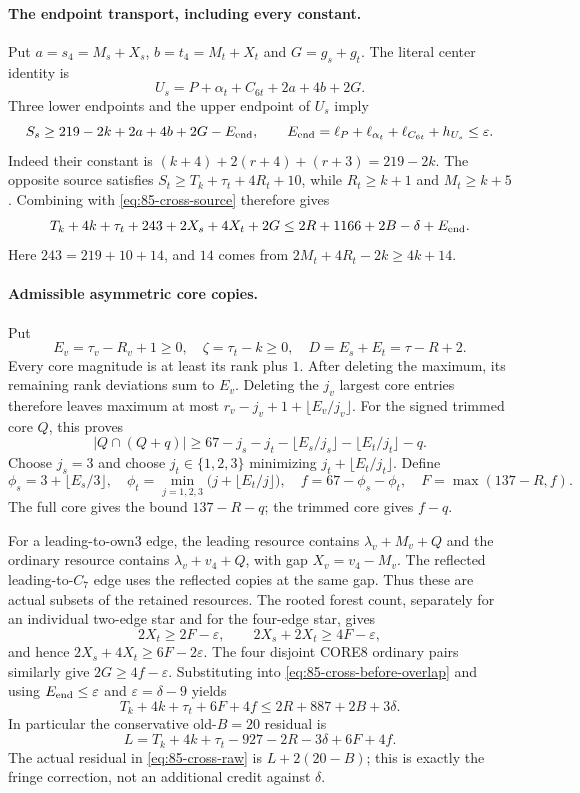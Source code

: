 \paragraph{The endpoint transport, including every constant.}
Put $a=s_4=M_s+X_s$, $b=t_4=M_t+X_t$ and $G=g_s+g_t$.
The literal center identity is
\[
 U_s=P+\alpha_t+C_{6t}+2a+4b+2G.
\]
Three lower endpoints and the upper endpoint of $U_s$ imply
\[
 S_s\ge219-2k+2a+4b+2G-E_{\rm end},\qquad
 E_{\rm end}=\ell_P+\ell_{\alpha_t}+\ell_{C_{6t}}+h_{U_s}
 \le\varepsilon.
\]
Indeed their constant is
$(k+4)+2(r+4)+(r+3)=219-2k$.
The opposite source satisfies
$S_t\ge T_k+\tau_t+4R_t+10$, while
$R_t\ge k+1$ and $M_t\ge k+5$.
Combining with \eqref{eq:85-cross-source} therefore gives
\begin{equation}\label{eq:85-cross-before-overlap}
 T_k+4k+\tau_t+243+2X_s+4X_t+2G
 \le2R+1166+2B-\delta+E_{\rm end}.
\end{equation}
Here $243=219+10+14$, and $14$ comes from
$2M_t+4R_t-2k\ge4k+14$.

\paragraph{Admissible asymmetric core copies.}
Put
\[
 E_v=\tau_v-R_v+1\ge0,\quad
 \zeta=\tau_t-k\ge0,\quad D=E_s+E_t=\tau-R+2.
\]
Every core magnitude is at least its rank plus $1$.
After deleting the maximum, its remaining rank deviations sum to $E_v$.
Deleting the $j_v$ largest core entries therefore leaves maximum at most
$r_v-j_v+1+\lfloor E_v/j_v\rfloor$.
For the signed trimmed core $Q$, this proves
\[
 |Q\cap(Q+q)|\ge
 67-j_s-j_t-\lfloor E_s/j_s\rfloor-\lfloor E_t/j_t\rfloor-q.
\]
Choose $j_s=3$ and choose $j_t\in\{1,2,3\}$ minimizing
$j_t+\lfloor E_t/j_t\rfloor$. Define
\[
 \phi_s=3+\lfloor E_s/3\rfloor,\quad
 \phi_t=\min_{j=1,2,3}\bigl(j+\lfloor E_t/j\rfloor\bigr),\quad
 f=67-\phi_s-\phi_t,
 \quad F=\max(137-R,f).
\]
The full core gives the bound $137-R-q$; the trimmed core gives $f-q$.

For a leading-to-own3 edge, the leading resource contains
$\lambda_v+M_v+Q$ and the ordinary resource contains
$\lambda_v+v_4+Q$, with gap $X_v=v_4-M_v$.
The reflected leading-to-$C_7$ edge uses the reflected copies at the
same gap. Thus these are actual subsets of the retained resources.
The rooted forest count, separately for an individual two-edge star
and for the four-edge star, gives
\[
 2X_t\ge2F-\varepsilon,\qquad
 2X_s+2X_t\ge4F-\varepsilon,
\]
and hence $2X_s+4X_t\ge6F-2\varepsilon$.
The four disjoint CORE8 ordinary pairs similarly give
$2G\ge4f-\varepsilon$.
Substituting into \eqref{eq:85-cross-before-overlap} and using
$E_{\rm end}\le\varepsilon$ and $\varepsilon=\delta-9$ yields
\begin{equation}\label{eq:85-cross-raw}
 T_k+4k+\tau_t+6F+4f
 \le2R+887+2B+3\delta.
\end{equation}
In particular the conservative old-$B=20$ residual is
\[
 L=T_k+4k+\tau_t-927-2R-3\delta+6F+4f.
\]
The actual residual in \eqref{eq:85-cross-raw} is
$L+2(20-B)$; this is exactly the fringe correction, not an additional
credit against $\delta$.

